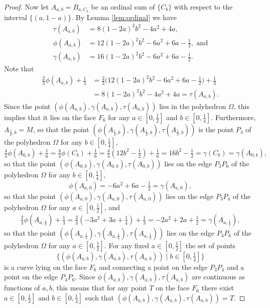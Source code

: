 \documentclass[12pt,a4paper]{amsart}
\theoremstyle{definition}
\begin{document}
\begin{proof}
Now let $A_{a,b} = B_{a,C_b}$ be an ordinal sum of $\{C_b\}$ with respect to the interval $\{(a, 1-a)\}$. By Lemma \ref{lem:ordinal} we have
\begin{align*}
   \tau(A_{a,b}) &= 8(1-2a)^2b^2-4a^2+4a, \\
   \phi(A_{a,b}) &= 12(1-2a)^2b^2-6a^2+6a-\tfrac12, \text{ and} \\
   \gamma(A_{a,b}) &= 16(1-2a)^2b^2-6a^2+6a-\tfrac12.
\end{align*}
Note that 
\begin{align*}
  \tfrac23\phi(A_{a,b})+\tfrac13 &= \tfrac23\big(12(1-2a)^2b^2-6a^2+6a-\tfrac12\big)+\tfrac13  \\
  &= 8(1-2a)^2b^2-4a^2+4a = \tau(A_{a,b}).
\end{align*}
Since the point $(\phi(A_{a,b}), \gamma(A_{a,b}), \tau(A_{a,b}))$ lies in the polyhedron $\Omega$, this implies that it lies on the face $F_6$ for any $a\in [0, \tfrac12]$ and $b\in [0, \tfrac14]$.
Furthermore, $A_{\frac12,b} = M$, so that the point $(\phi(A_{\frac12,b}), \gamma(A_{\frac12,b}), \tau(A_{\frac12,b}))$ is the point $P_4$ of the polyhedron $\Omega$ for any $b\in [0, \tfrac14]$, 
$$   \tfrac43\phi(A_{0,b}) + \tfrac16  = \tfrac43\phi(C_b) + \tfrac16 = \tfrac43(12b^2-\tfrac12) + \tfrac16 = 16b^2-\tfrac12 = \gamma(C_b) = \gamma(A_{0,b}),$$
so that the point $(\phi(A_{0,b}), \gamma(A_{0,b}), \tau(A_{0,b}))$ lies on the edge $P_3P_6$ of the polyhedron $\Omega$ for any $b\in [0, \tfrac14]$, 
$$  \phi(A_{a,0}) = -6a^2+6a-\tfrac12 = \gamma(A_{a,0}),$$
so that the point $(\phi(A_{a,0}), \gamma(A_{a,0}), \tau(A_{a,0}))$ lies on the edge $P_3P_4$ of the polyhedron $\Omega$ for any $a\in [0, \tfrac12]$, and
$$  \tfrac23\phi(A_{a,\frac14})+\tfrac13 = \tfrac23(-3a^2+3a+\tfrac14) + \tfrac13 = -2a^2+2a+\tfrac12 = \gamma(A_{a,\frac14}),$$
so that the point $(\phi(A_{a,\frac14}), \gamma(A_{a,\frac14}), \tau(A_{a,\frac14}))$ lies on the edge $P_4P_6$ of the polyhedron $\Omega$ for any $a\in [0, \tfrac12]$. For any fixed $a\in [0, \tfrac12]$ the set of points 
$$\big\{(\phi(A_{a,b}), \gamma(A_{a,b}), \tau(A_{a,b})) \mid b\in [0, \tfrac14]\big\}$$ 
is a curve lying on the face $F_6$ and connecting a point on the edge $P_3P_4$ and a point on the edge $P_4P_6$. Since $\phi(A_{a,b}), \gamma(A_{a,b}), \tau(A_{a,b})$ are continuous as functions of $a,b$, this means that for any point $T$ on the face $F_6$ there exist $a\in [0, \tfrac12]$ and $b\in [0, \tfrac14]$ such that $(\phi(A_{a,b}), \gamma(A_{a,b}), \tau(A_{a,b})) = T$.
\end{proof}
\end{document}

